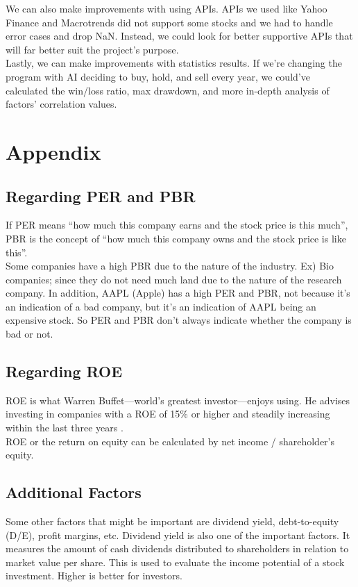 \documentclass[fontsize=11pt]{article}
\begin{document}
We can also make improvements with using APIs. APIs we used like Yahoo Finance and Macrotrends did not support some stocks and we had to handle error cases and drop NaN. Instead, we could look for better supportive APIs that will far better suit the project's purpose.\\

Lastly, we can make improvements with statistics results. If we're changing the program with AI deciding to buy, hold, and sell every year, we could've calculated the win/loss ratio, max drawdown, and more in-depth analysis of factors' correlation values.

\pagebreak
\section{Appendix}

\subsection{Regarding PER and PBR}
If PER means “how much this company earns and the stock price is this much”, PBR is the concept of “how much this company owns and the stock price is like this”.
\\

Some companies have a high PBR due to the nature of the industry.  Ex) Bio companies; since they do not need much land due to the nature of the research company. In addition, AAPL (Apple)  has a high PER and PBR, not because it’s an indication of a bad company, but it’s an indication of AAPL being an expensive stock. So PER and PBR don’t always indicate whether the company is bad or not.

\subsection{Regarding ROE}
ROE is what Warren Buffet—world’s greatest investor—enjoys using. He advises investing in companies with a ROE of 15\% or higher and steadily increasing within the last three years \cite{investopediawarren}.
\\

ROE or the return on equity can be calculated by net income / shareholder’s equity.

\subsection{Additional Factors}
Some other factors that might be important are dividend yield, debt-to-equity (D/E), profit margins, etc. Dividend yield is also one of the important factors. It measures the amount of cash dividends distributed to shareholders in relation to market value per share. This is used to evaluate the income potential of a stock investment. Higher is better for investors.
\end{document}
